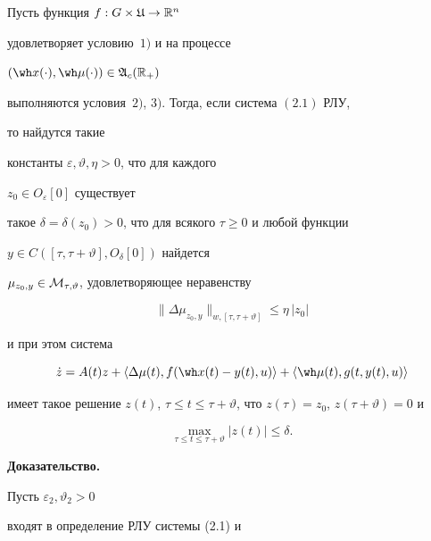 \begin{lems}


Пусть функция $f:G\times\frak U\to\Bbb R^n$


удовлетворяет условию~$1)$ и на процессе


$(\wh x(\cdot),\wh\mu(\cdot))\in\frak A_c(\bR_+)$


выполняются условия~$2)$, $3)$. Тогда, если система $(2.1)$ РЛУ, 


то найдутся такие


константы $\varepsilon,\vartheta,\eta>0$, что для каждого


$z_0\in O_\varepsilon[0]$ существует


такое $\delta=\delta(z_0)>0$, что для всякого $\tau\ge0$ и любой функции


$y\in C([\tau,\tau+\vartheta],O_\delta[0])$ найдется


$\mu_{z_0,y}\in\cal M_{\tau,\vartheta}$, удовлетворяющее неравенству


\begin{equation}


\|\Delta\mu_{z_0,y}\|_{w,[\tau,\tau+\vartheta]}\le\eta\,|z_0|


\end{equation}


и при этом система


\begin{equation*}


\Dot z=A(t)z+\langle\Delta\mu(t),f(\wh x(t)-y(t),u)\rangle+


\langle\wh\mu(t),g(t,y(t),u)\rangle


\end{equation*}


имеет такое решение $z(t)$, $\tau\le


t\le\tau+\vartheta$, что $z(\tau)=z_0$, $z(\tau+\vartheta)=0$ и


\begin{equation}


\max_{\tau\le t\le\tau+\vartheta}|z(t)|\le\delta.


\end{equation}


\end{lems}





{\bf Доказательство.}


Пусть $\varepsilon_2,\vartheta_2>0$


входят в определение РЛУ системы (2.1) и


